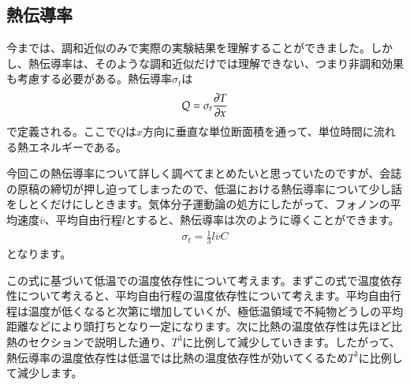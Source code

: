\documentclass[10pt,b5paper,papersize,dvipdfmx]{jsbook}
\begin{document}
\subsection{熱伝導率}
今までは、調和近似のみで実際の実験結果を理解することができました。しかし、熱伝導率は、そのような調和近似だけでは理解できない、つまり非調和効果も考慮する必要がある。熱伝導率$\sigma_t$は
\begin{align}
  Q = \sigma_t \pdv {T}{x}
\end{align}
で定義される。ここで$Q$は$x$方向に垂直な単位断面積を通って、単位時間に流れる熱エネルギーである。\par
今回この熱伝導率について詳しく調べてまとめたいと思っていたのですが、会誌の原稿の締切が押し迫ってしまったので、低温における熱伝導率について少し話をしとくだけにしときます。気体分子運動論の処方にしたがって、フォノンの平均速度$\overline{v}$、平均自由行程$l$とすると、熱伝導率は次のように導くことができます。
\begin{align}
  \sigma_t = \frac{1}{3}l\overline{v}C
\end{align}
となります。\par
この式に基づいて低温での温度依存性について考えます。まずこの式で温度依存性について考えると、平均自由行程の温度依存性について考えます。平均自由行程は温度が低くなると次第に増加していくが、極低温領域で不純物どうしの平均距離などにより頭打ちとなり一定になります。次に比熱の温度依存性は先ほど比熱のセクションで説明した通り、$T^3$に比例して減少していきます。したがって、熱伝導率の温度依存性は低温では比熱の温度依存性が効いてくるため$T^3$に比例して減少します。
\end{document}
